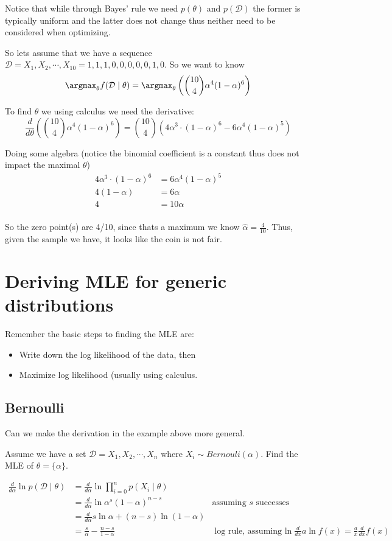 Notice that while through Bayes' rule we need $p(\theta)$ and $p(\mathcal{D})$ 
the former is typically uniform and the latter does not change thus neither need to be considered when optimizing. 

So lets assume that we have a sequence $\mathcal{D} = X_1, X_2, \cdots, X_{10} = 1,1,1,0,0,0,0,0,1,0$.
So we want to know 
\[\argmax_\theta f(\mathcal{D}\mid\theta) = \argmax_\theta \left({10 \choose 4} \alpha^4(1-\alpha)^6\right)\]

To find $\theta$ we using calculus we need the derivative: 
\[\frac{d}{d\theta}\left({10 \choose 4} \alpha^4(1-\alpha)^6\right) = {10 \choose 4}\left(4\alpha^3\cdot(1-\alpha)^6-6\alpha^4(1-\alpha)^5\right)\]

Doing some algebra (notice the binomial coefficient is a constant thus does not impact the maximal $\theta$)
\begin{align*}
4\alpha^3\cdot(1-\alpha)^6&=6\alpha^4(1-\alpha)^5\\
4(1-\alpha) &= 6\alpha\\
4 &= 10\alpha\\
\end{align*}

So the zero point(s) are 4/10, since thats a maximum we know $\hat{\alpha} = \frac{4}{10}$.
Thus, given the sample we have, it looks like the coin is not fair. 

\section{Deriving MLE for generic distributions}
Remember the basic steps to finding the MLE are: 
\begin{itemize}
\item Write down the log likelihood of the data, then
\item Maximize log likelihood (usually using calculus. 
\end{itemize}

\subsection{Bernoulli}

Can we make the derivation in the example above more general. 

Assume we have a set $\mathcal{D} = X_1, X_2, \cdots, X_n$ 
where $X_i \sim Bernouli(\alpha)$.
Find the MLE of $\theta=\{\alpha\}$.

\begin{align*}
\frac{d}{d\alpha} \ln p(\mathcal{D}\mid\theta) 	&= \frac{d}{d\alpha} \ln \prod_{i=0}^n p(X_i\mid\theta)\\
					    		     	&= \frac{d}{d\alpha} \ln \alpha^s(1-\alpha)^{n-s} & \text{assuming $s$ successes}\\
					    			& = \frac{d}{d\alpha} s \ln \alpha + (n-s) \ln (1-\alpha)\\
								& = \frac{s}{\alpha} - \frac{n-s}{1-\alpha} 		& \text{log rule, assuming $\ln$} \frac{d}{dx} a \ln f(x) = \frac{a}{x} \frac{d}{dx}  f(x)			     
\end{align*}

